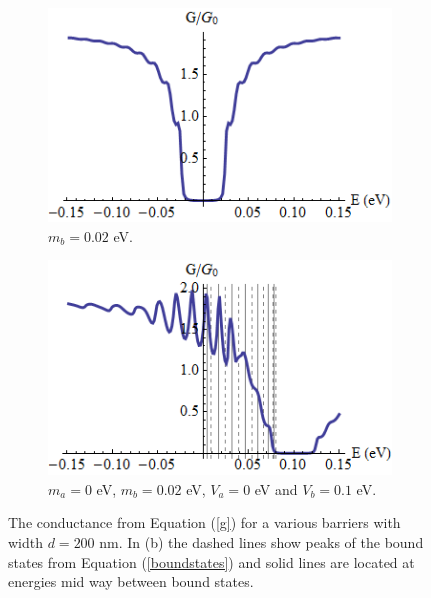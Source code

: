 \begin{figure}
	\begin{subfigure}{0.45\textwidth}
		\centerline{\includegraphics[scale=0.6]{images/rectangular-barrier-conductance-c}}
		\caption{$m_{b}=0.02$ eV.}
	\end{subfigure}
	\hspace{1.2cm}
	\begin{subfigure}{0.45\textwidth}
		\centerline{\includegraphics[scale=0.6]{images/rectangular-barrier-conductance-max}}
		\caption{$m_{a}=0$ eV, $m_{b}=0.02$ eV, $V_{a}=0$ eV and $V_{b}=0.1$ eV.}
		\label{conductance-max}
	\end{subfigure}
	\caption{The conductance from Equation (\ref{g}) for a various barriers with width $d=200$ nm. In (b) the dashed lines show peaks of the bound states from Equation (\ref{boundstates}) and solid lines are located at energies mid way between bound states.}
	\label{rectangular-barrier-conductance-c}
\end{figure}
